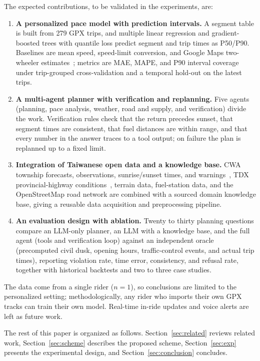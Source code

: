 The expected contributions, to be validated in the experiments, are:
\begin{enumerate}
  \item \textbf{A personalized pace model with prediction intervals.} A segment table is built from 279 GPX trips, and multiple linear regression and gradient-boosted trees with quantile loss predict segment and trip times as P50/P90. Baselines are mean speed, speed-limit conversion, and Google Maps two-wheeler estimates~\cite{googleroutes2026}; metrics are MAE, MAPE, and P90 interval coverage under trip-grouped cross-validation and a temporal hold-out on the latest trips.
  \item \textbf{A multi-agent planner with verification and replanning.} Five agents (planning, pace analysis, weather, road and supply, and verification) divide the work. Verification rules check that the return precedes sunset, that segment times are consistent, that fuel distances are within range, and that every number in the answer traces to a tool output; on failure the plan is replanned up to a fixed limit.
  \item \textbf{Integration of Taiwanese open data and a knowledge base.} CWA township forecasts, observations, sunrise/sunset times, and warnings~\cite{cwa2026opendata}, TDX provincial-highway conditions~\cite{tdx2026traffic}, terrain data, fuel-station data, and the OpenStreetMap road network are combined with a sourced domain knowledge base, giving a reusable data acquisition and preprocessing pipeline.
  \item \textbf{An evaluation design with ablation.} Twenty to thirty planning questions compare an LLM-only planner, an LLM with a knowledge base, and the full agent (tools and verification loop) against an independent oracle (precomputed civil dusk, opening hours, traffic-control events, and actual trip times), reporting violation rate, time error, consistency, and refusal rate, together with historical backtests and two to three case studies.
\end{enumerate}
The data come from a single rider ($n = 1$), so conclusions are limited to the personalized setting; methodologically, any rider who imports their own GPX tracks can train their own model. Real-time in-ride updates and voice alerts are left as future work.

The rest of this paper is organized as follows. Section~\ref{sec:related} reviews related work, Section~\ref{sec:scheme} describes the proposed scheme, Section~\ref{sec:exp} presents the experimental design, and Section~\ref{sec:conclusion} concludes.
